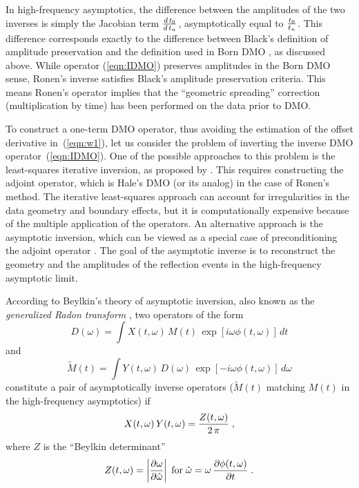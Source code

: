 In high-frequency asymptotics, the difference between the amplitudes
of the two inverses is simply the Jacobian term ${d\,t_0 \over
  d\,t_n}$, asymptotically equal to ${t_0 \over t_n}$. This difference
corresponds exactly to the difference between Black's definition of
amplitude preservation \cite[]{GEO58-01-00470066} and the definition used in Born
DMO \cite[]{born,GEO56-02-01820189}, as discussed above. While operator
(\ref{eqn:IDMO}) preserves amplitudes in the Born DMO sense, Ronen's
inverse satisfies Black's amplitude preservation criteria. This means
Ronen's operator implies that the ``geometric spreading'' correction
(multiplication by time) has been performed on the data prior to DMO.

To construct a one-term DMO operator, thus avoiding the estimation of
the offset derivative in~(\ref{eqn:w1}), let us consider the problem
of inverting the inverse DMO operator~(\ref{eqn:IDMO}). One of the
possible approaches to this problem is the least-squares iterative
inversion, as proposed by \cite{GEO52-07-09730984}. This
requires constructing the adjoint operator, which is Hale's DMO (or
its analog) in the case of Ronen's method. The iterative least-squares
approach can account for irregularities in the data geometry
\cite[]{IZO,SEG-1994-1545} and boundary effects, but it is computationally
expensive because of the multiple application of the operators. An
alternative approach is the asymptotic inversion, which can be viewed
as a special case of preconditioning the adjoint operator
\cite[]{SEG-1988-S17.5,SEG-1996-0032}. The goal of the asymptotic inverse is to
reconstruct the geometry and the amplitudes of the reflection events
in the high-frequency asymptotic limit.

According to Beylkin's theory of asymptotic inversion, also known as
the {\em generalized Radon transform} \cite[]{beylkin}, two operators of the
form
\begin{equation}
D(\omega)=\int X(t,\omega)\,M(t)\,
\exp\left[i\omega \phi (t,\omega)\right]\,dt
\label{eqn:b0}
\end{equation}
and
\begin{equation}
\widetilde{M}(t)=\int Y(t,\omega)\,D(\omega)\,
\exp\left[-i\omega \phi (t,\omega)\right]\,d\omega
\label{eqn:b1}
\end{equation}
constitute a pair of asymptotically inverse operators
($\widetilde{M}(t)$ matching $M(t)$ in the high-frequency asymptotics)
if
\begin{equation}
X(t,\omega)\,Y(t,\omega)={Z(t,\omega) \over {2\,\pi}}\;,
\label{eqn:belka}
\end{equation}
where $Z$ is the ``Beylkin determinant''
\begin{equation}
Z(t,\omega)=\left|\partial \omega \over \partial \hat{\omega}\right|\;
\mbox{for}\;\hat{\omega}=\omega\,{\partial \phi(t,\omega) \over \partial t}\;.
\label{eqn:det}
\end{equation}

